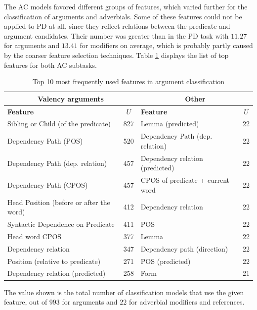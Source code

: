 \documentclass[12pt,notitlepage,a4paper]{report}
\begin{document}
The AC models favored different groups of features, which varied further for the classification of arguments and adverbials. Some of these features could not be applied to PD at all, since they reflect relations between the predicate and argument candidates. Their number was greater than in the PD task with $11.27$ for arguments and $13.41$ for modifiers on average, which is probably partly caused by the coarser feature selection techniques. Table \ref{tab:feats-ac} displays the list of top features for both AC subtasks.

\begin{table}[htb]\footnotesize
\caption{Top 10 most frequently used features in argument classification}\label{tab:feats-ac}
\begin{center}
\begin{tabular}{|l|c||l|c|}\hline
\multicolumn{2}{|c||}{\bf Valency arguments} & \multicolumn{2}{c|}{\bf Other} \\\hline
\bf Feature & $U$ & \bf Feature & $U$ \\\hline
Sibling or Child (of the predicate) & 827 & Lemma (predicted) & 22 \\
Dependency Path (POS) & 520 & Dependency Path (dep. relation) & 22 \\
Dependency Path (dep. relation)  & 457 & Dependency relation (predicted) & 22 \\
Dependency Path (CPOS) & 457 & CPOS of predicate + current word & 22 \\
Head Position (before or after the word) & 412 & Dependency relation & 22 \\
Syntactic Dependence on Predicate & 411 & POS & 22 \\
Head word CPOS & 377 & Lemma & 22 \\
Dependency relation & 347 & Dependency path (direction) & 22 \\
Position (relative to predicate) & 271 & POS (predicted) & 22 \\
Dependency relation (predicted) & 258 & Form & 21 \\\hline
\end{tabular}
\end{center}
The value shown is the total number of classification models that use the given feature, out of $993$ for arguments and $22$ for adverbial modifiers and references.
\end{table}
\end{document}
